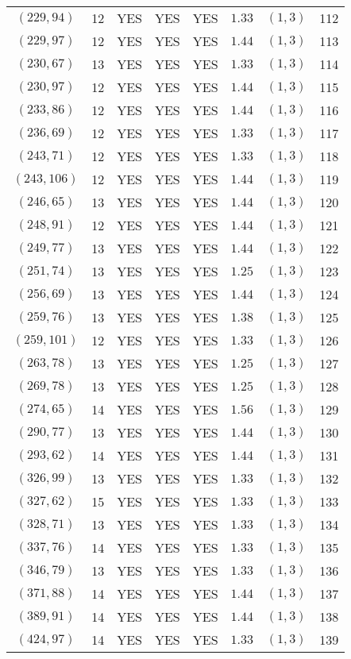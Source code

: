 \begin{longtable}{|c|c|c|c|c|c|c|c|}
$(229,94)$ & 12 & YES & YES & YES & $1.33$ & $(1,3)$ & 112\\
$(229,97)$ & 12 & YES & YES & YES & $1.44$ & $(1,3)$ & 113\\
$(230,67)$ & 13 & YES & YES & YES & $1.33$ & $(1,3)$ & 114\\
$(230,97)$ & 12 & YES & YES & YES & $1.44$ & $(1,3)$ & 115\\
$(233,86)$ & 12 & YES & YES & YES & $1.44$ & $(1,3)$ & 116\\
$(236,69)$ & 12 & YES & YES & YES & $1.33$ & $(1,3)$ & 117\\
$(243,71)$ & 12 & YES & YES & YES & $1.33$ & $(1,3)$ & 118\\
$(243,106)$ & 12 & YES & YES & YES & $1.44$ & $(1,3)$ & 119\\
$(246,65)$ & 13 & YES & YES & YES & $1.44$ & $(1,3)$ & 120\\
$(248,91)$ & 12 & YES & YES & YES & $1.44$ & $(1,3)$ & 121\\
$(249,77)$ & 13 & YES & YES & YES & $1.44$ & $(1,3)$ & 122\\
$(251,74)$ & 13 & YES & YES & YES & $1.25$ & $(1,3)$ & 123\\
$(256,69)$ & 13 & YES & YES & YES & $1.44$ & $(1,3)$ & 124\\
$(259,76)$ & 13 & YES & YES & YES & $1.38$ & $(1,3)$ & 125\\
$(259,101)$ & 12 & YES & YES & YES & $1.33$ & $(1,3)$ & 126\\
$(263,78)$ & 13 & YES & YES & YES & $1.25$ & $(1,3)$ & 127\\
$(269,78)$ & 13 & YES & YES & YES & $1.25$ & $(1,3)$ & 128\\
$(274,65)$ & 14 & YES & YES & YES & $1.56$ & $(1,3)$ & 129\\
$(290,77)$ & 13 & YES & YES & YES & $1.44$ & $(1,3)$ & 130\\
$(293,62)$ & 14 & YES & YES & YES & $1.44$ & $(1,3)$ & 131\\
$(326,99)$ & 13 & YES & YES & YES & $1.33$ & $(1,3)$ & 132\\
$(327,62)$ & 15 & YES & YES & YES & $1.33$ & $(1,3)$ & 133\\
$(328,71)$ & 13 & YES & YES & YES & $1.33$ & $(1,3)$ & 134\\
$(337,76)$ & 14 & YES & YES & YES & $1.33$ & $(1,3)$ & 135\\
$(346,79)$ & 13 & YES & YES & YES & $1.33$ & $(1,3)$ & 136\\
$(371,88)$ & 14 & YES & YES & YES & $1.44$ & $(1,3)$ & 137\\
$(389,91)$ & 14 & YES & YES & YES & $1.44$ & $(1,3)$ & 138\\
$(424,97)$ & 14 & YES & YES & YES & $1.33$ & $(1,3)$ & 139
\end{longtable}
